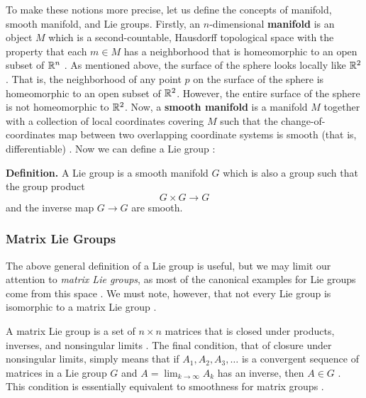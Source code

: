 \documentclass[11pt, a4paper, oneside]{article}
\theoremstyle{plain}
\theoremstyle{definition}
\theoremstyle{example}
\begin{document}
\par
To make these notions more precise, let us define the concepts of manifold, smooth manifold, and Lie groups. Firstly, an $n$-dimensional \textbf{manifold} is an object $M$ which is a second-countable, Hausdorff topological space with the property that each $m \in M$ has a neighborhood that is homeomorphic to an open subset of $\mathbb{R}^n$ \cite[\S 1.5]{hall}. As mentioned above, the surface of the sphere looks locally like $\mathbb{R}^2$. That is, the neighborhood of any point $p$ on the surface of the sphere is homeomorphic to an open subset of $\mathbb{R}^2$. However, the entire surface of the sphere is not homeomorphic to $\mathbb{R}^2$. Now, a \textbf{smooth manifold} is a manifold $M$ together with a collection of local coordinates covering $M$ such that the change-of-coordinates map between two overlapping coordinate systems is smooth (that is, differentiable) \cite[\S 1.5]{hall}. Now we can define a Lie group \cite[\S 1.5, Definition 1.20]{hall}:

\par
\textbf{Definition.} A Lie group is a smooth manifold $G$ which is also a group such that the group product $$G \times G \to G$$ and the inverse map $G \to G$ are smooth.

\subsubsection{Matrix Lie Groups}

\par
The above general definition of a Lie group is useful, but we may limit our attention to \textit{matrix Lie groups}, as most of the canonical examples for Lie groups come from this space \cite[\S 1.1]{stillwell}. We must note, however, that not every Lie group is isomorphic to a matrix Lie group \cite[\S 1.5]{hall}.

\par
A matrix Lie group is a set of $n \times n$ matrices that is closed under products, inverses, and nonsingular limits \cite[\S 1.1]{stillwell}. The final condition, that of closure under nonsingular limits, simply means that if $A_1, A_2, A_3, \ldots$ is a convergent sequence of matrices in a Lie group $G$ and $A = \lim_{k \to \infty} A_k$ has an inverse, then $A \in G$ \cite[\S 1.1]{stillwell}. This condition is essentially equivalent to smoothness for matrix groups \cite[\S 1.1]{stillwell}.
\end{document}
